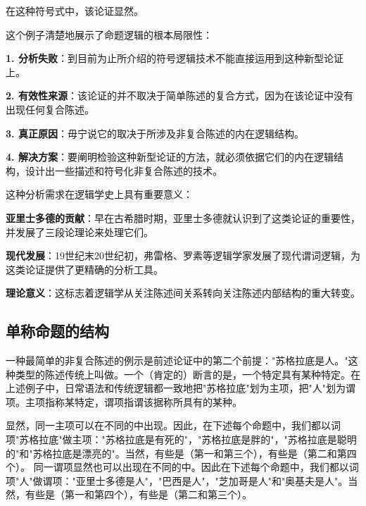 在这种符号式中，该论证显然。

\begin{theorembox}[title=命题逻辑分析的失败与原因]
这个例子清楚地展示了命题逻辑的根本局限性：

\textbf{1. 分析失败}：到目前为止所介绍的符号逻辑技术不能直接运用到这种新型论证上。

\textbf{2. 有效性来源}：该论证的并不取决于简单陈述的复合方式，因为在该论证中没有出现任何复合陈述。

\textbf{3. 真正原因}：毋宁说它的取决于所涉及非复合陈述的内在逻辑结构。

\textbf{4. 解决方案}：要阐明检验这种新型论证的方法，就必须依据它们的内在逻辑结构，设计出一些描述和符号化非复合陈述的技术。
\end{theorembox}

\begin{examplebox}[title=谓词逻辑的历史必然性]
这种分析需求在逻辑学史上具有重要意义：

\textbf{亚里士多德的贡献}：早在古希腊时期，亚里士多德就认识到了这类论证的重要性，并发展了三段论理论来处理它们。

\textbf{现代发展}：19世纪末20世纪初，弗雷格、罗素等逻辑学家发展了现代谓词逻辑，为这类论证提供了更精确的分析工具。

\textbf{理论意义}：这标志着逻辑学从关注陈述间关系转向关注陈述内部结构的重大转变。
\end{examplebox}

\subsection{单称命题的结构}

\begin{theorembox}[title=单称命题的定义]
一种最简单的非复合陈述的例示是前述论证中的第二个前提："苏格拉底是人。"这种类型的陈述传统上叫做。一个（肯定的）断言的是，一个特定具有某种特定。在上述例子中，日常语法和传统逻辑都一致地把"苏格拉底"划为主项，把"人"划为谓项。主项指称某特定，谓项指谓该据称所具有的某种。
\end{theorembox}

显然，同一主项可以在不同的中出现。因此，在下述每个命题中，我们都以词项"苏格拉底"做主项："苏格拉底是有死的"，"苏格拉底是胖的"，"苏格拉底是聪明的"和"苏格拉底是漂亮的"。当然，有些是（第一和第三个），有些是（第二和第四个）。\cite{quine1953} 同一谓项显然也可以出现在不同的中。因此在下述每个命题中，我们都以词项"人"做谓项："亚里士多德是人"，"巴西是人"，"芝加哥是人"和"奥基夫是人"。当然，有些是（第一和第四个），有些是（第二和第三个）。

